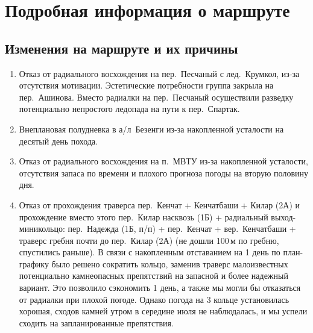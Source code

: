 \section{Подробная информация о маршруте}\label{sec:route}
	\subsection{Изменения на маршруте и их причины}\label{subsec:changes_of_way}
		\begin{enumerate}
			\item Отказ от радиального восхождения на пер.~Песчаный с лед.~Крумкол, из-за отсутствия мотивации.
			Эстетические потребности группа закрыла на пер.~Ашинова. Вместо радиалки на пер.~Песчаный осуществили
			разведку потенциально непростого ледопада на пути к пер.~Спартак.
			\item Внеплановая полудневка в а/л~Безенги из-за накопленной усталости на десятый день похода.
			\item Отказ от радиального восхождения на п.~МВТУ из-за накопленной усталости, отсутствия запаса по
			времени и плохого прогноза погоды на вторую половину дня.
			\item Отказ от прохождения траверса пер.~Кенчат + Кенчатбаши + Килар (2А) и прохождение вместо этого
			пер.~Килар насквозь (1Б) + радиальный выход-миникольцо: пер.~Надежда (1Б, п/п) + пер.~Кенчат +
			вер.~Кенчатбаши + траверс гребня почти до пер.~Килар (2А) (не дошли 100\,м по гребню, спустились раньше).
			В связи с накопленным отставанием на 1 день по план-графику было решено сократить кольцо, заменив траверс
			малоизвестных потенциально камнеопасных препятствий на запасной и более надежный вариант. Это позволило
			сэкономить 1 день, а также мы могли бы отказаться от радиалки при плохой погоде. Однако погода на 3
			кольце установилась хорошая, сходов камней утром в середине июля не наблюдалась, и мы успели сходить на
			запланированные препятствия.
		\end{enumerate}
	
	
